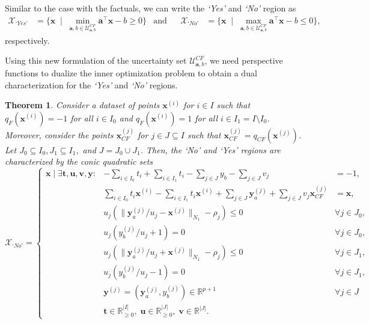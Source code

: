 \documentclass{article}
\newtheorem{theorem}{Theorem}
\begin{document}
Similar to the case with the factuals, we can write the \textit{`Yes'} and \textit{`No'} region as
\begin{align*}
    \mathcal{X}_{\textit{`Yes'}}&=\{ \bm{x}  \;\; | \;\;  \min_{\bm{a},b\in \mathcal{U}_{\bm{a},b}^{CF}}\bm{a}^{\top}\bm{x} - b \geq 0  \} &\text{and}&&
  \mathcal{X}_{\textit{`No'}}&=\{ \bm{x}  \;\; | \;\;  \max_{\bm{a},b\in \mathcal{U}_{\bm{a},b}^{CF}}\bm{a}^{\top}\bm{x} - b \leq 0  \},
\end{align*}
respectively.

Using this new formulation of the uncertainty set $\mathcal{U}_{\bm{a},b}^{CF}$, we need perspective functions to dualize the inner optimization problem to obtain a dual characterization for the \textit{`Yes'}  and \textit{`No'} regions. 

\begin{theorem}\label{thm:region-CF}
Consider a dataset of points $\bm{x}^{(i)}$ for $i\in I$ such that $q_F(\bm{x}^{(i)})=-1$ for all $i\in I_{0}$ and $q_F(\bm{x}^{(i)})=1$ for all $i\in I_1=I\setminus I_{0}$. Moreover, consider the points $\bm{x}_{CF}^{(j)}$ for $j\in J\subseteq I$ such that $\bm{x}_{CF}^{(j)}=q_{CF}(\bm{x}^{(j)})$. Let $J_{0}\subseteq I_{0}, J_1\subseteq I_1,$ and $J=J_{0}\cup J_1$. Then, the \textit{`No'}  and \textit{`Yes'} regions are characterized by the conic quadratic sets
\[ 
\mathcal{X}_{\textit{`No'}} =
\left\{ \begin{array}{lll}
\bm{x}  \mid \exists \bm{t},\bm{u},\bm{v},\bm{y}:& 
\displaystyle-\sum_{i\in I_{0}}t_{i} + \displaystyle\sum_{i\in I_1}t_{i}
-\displaystyle\sum_{j\in J}y_{b}
-\displaystyle\sum_{j\in J}v_{j} &= -1,\\  
&\displaystyle\sum_{i\in I_{0}}t_{i}\bm{x}^{(i)} - \displaystyle\sum_{i\in I_1}t_{i}\bm{x}^{(i)}+\displaystyle\sum_{j\in J}\bm{y}_a^{(j)}+\displaystyle\sum_{j\in J}v_{j}\bm{x}_{CF}^{(j)} &= \bm{x},\\
&u_j(\| \bm{y}_a^{(j)}/u_j - \bm{x}^{(j)}\|_{N_1}  - \rho_j)\leq  0&\forall j\in J_{0}, \\
 &u_j (y_b^{(j)}/u_j + 1)=0&\forall j\in J_{0},\\
 &u_j(\| \bm{y}_a^{(j)}/u_j + \bm{x}^{(j)}\|_{N_1} - \rho_j)\leq  0&\forall j\in J_1,\\
 &u_j (y_b^{(j)}/u_j - 1)=0&\forall j\in J_1,\\
 &\bm{y}^{(j)}=(\bm{y}_a^{(j)},y_b^{(j)})\in\mathbb{R}^{p+1}&\forall j\in J\\
 & \bm{t}\in\mathbb{R}^{|I|}_{\geq 0},\;\bm{u}\in\mathbb{R}^{|J|}_{\geq 0},\; \bm{v}\in\mathbb{R}^{|J|}.

\end{array}\]
\end{theorem}
\end{document}
